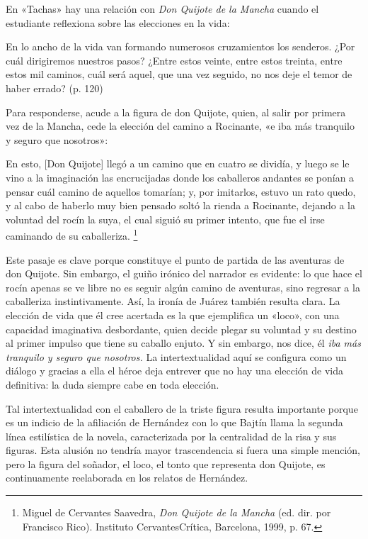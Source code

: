 \documentclass[14pt,twoside,final]{extbook} %
\let\oldfootnote\footnote
\renewcommand\footnote[1]{%
\oldfootnote{\hspace{1mm}#1}}
\begin{document}
En «Tachas» hay una relación con \emph{Don Quijote de la Mancha} cuando el estudiante reflexiona sobre las elecciones en la vida:
\begin{quoting}
En lo ancho de la vida van formando numerosos cruzamientos los senderos. ¿Por cuál dirigiremos nuestros pasos? ¿Entre estos veinte, entre estos treinta, entre estos mil caminos, cuál será aquel, que una vez seguido, no nos deje el temor de haber errado? (p. 120)
\end{quoting}
Para responderse, acude a la figura de don Quijote, quien, al salir por primera vez de la Mancha, cede la elección del camino a Rocinante, «e iba más tranquilo y seguro que nosotros»:
\begin{quoting}
En esto, [Don Quijote] llegó a un camino que en cuatro se dividía, y luego se le vino a la imaginación las encrucijadas donde los caballeros andantes se ponían a pensar cuál camino de aquellos
tomarían; y, por imitarlos, estuvo un rato quedo, y al cabo de haberlo muy bien pensado soltó la rienda a Rocinante, dejando a la voluntad del rocín la suya, el cual siguió su primer intento, que fue el irse caminando de su caballeriza.\footnote{Miguel de Cervantes Saavedra, \emph{Don Quijote de la Mancha} (ed. dir. por Francisco Rico). Instituto Cervantes\kernedslash Crítica, Barcelona, 1999, p. 67.}
\end{quoting}
Este pasaje es clave porque constituye el punto de partida de las aventuras de don Quijote. Sin embargo, el guiño irónico del narrador es evidente: lo que hace el rocín apenas se ve libre no es seguir algún camino de aventuras, sino regresar a la caballeriza instintivamente. Así, la ironía de Juárez también resulta clara. La elección de vida que él cree acertada es la que ejemplifica un «loco», con una capacidad imaginativa desbordante, quien decide plegar su voluntad y su destino al primer impulso que tiene su caballo enjuto. Y sin embargo, nos dice, él \emph{iba más tranquilo y seguro que nosotros.} La intertextualidad aquí se configura como un diálogo y gracias a ella el héroe deja entrever que no hay una elección de vida definitiva: la duda siempre cabe en toda elección.

Tal intertextualidad con el caballero de la triste figura resulta importante porque es un indicio de la afiliación de Hernández con lo que Bajtín llama la segunda línea estilística de la novela, caracterizada por la centralidad de la risa y sus figuras. Esta alusión no tendría mayor trascendencia si fuera una simple mención, pero la figura del soñador, el loco, el tonto que representa don Quijote, es continuamente reelaborada en los relatos de Hernández.
\end{document}
